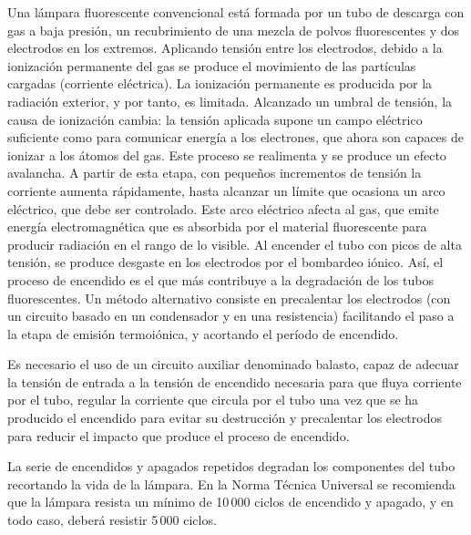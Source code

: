 Una lámpara fluorescente convencional está formada por un tubo de
descarga con gas a baja presión, un recubrimiento de una mezcla de
polvos fluorescentes y dos electrodos en los extremos. Aplicando tensión
entre los electrodos, debido a la ionización permanente del gas se
produce el movimiento de las partículas cargadas (corriente eléctrica).
La ionización permanente es producida por la radiación exterior, y
por tanto, es limitada. Alcanzado un umbral de tensión, la causa de
ionización cambia: la tensión aplicada supone un campo eléctrico suficiente
como para comunicar energía a los electrones, que ahora son capaces
de ionizar a los átomos del gas. Este proceso se realimenta y se produce
un efecto avalancha. A partir de esta etapa, con pequeños incrementos
de tensión la corriente aumenta rápidamente, hasta alcanzar un límite
que ocasiona un arco eléctrico, que debe ser controlado. Este arco
eléctrico afecta al gas, que emite energía electromagnética que es
absorbida por el material fluorescente para producir radiación en
el rango de lo visible. Al encender el tubo con picos de alta tensión,
se produce desgaste en los electrodos por el bombardeo iónico. Así,
el proceso de encendido es el que más contribuye a la degradación
de los tubos fluorescentes. Un método alternativo consiste en precalentar
los electrodos (con un circuito basado en un condensador y en una
resistencia) facilitando el paso a la etapa de emisión termoiónica,
y acortando el período de encendido. 

Es necesario el uso de un circuito auxiliar denominado balasto, capaz
de adecuar la tensión de entrada a la tensión de encendido necesaria
para que fluya corriente por el tubo, regular la corriente que circula
por el tubo una vez que se ha producido el encendido para evitar su
destrucción y precalentar los electrodos para reducir el impacto que
produce el proceso de encendido. 

La serie de encendidos y apagados repetidos degradan los componentes
del tubo recortando la vida de la lámpara. En la Norma Técnica Universal
\cite{Egido.Lorenzo1998} se recomienda que la lámpara resista un
mínimo de 10\,000 ciclos de encendido y apagado, y en todo caso,
deberá resistir 5\,000 ciclos. 

